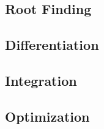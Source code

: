 









\subsection{Root Finding}


\subsection{Differentiation}


\subsection{Integration}



\subsection{Optimization}

